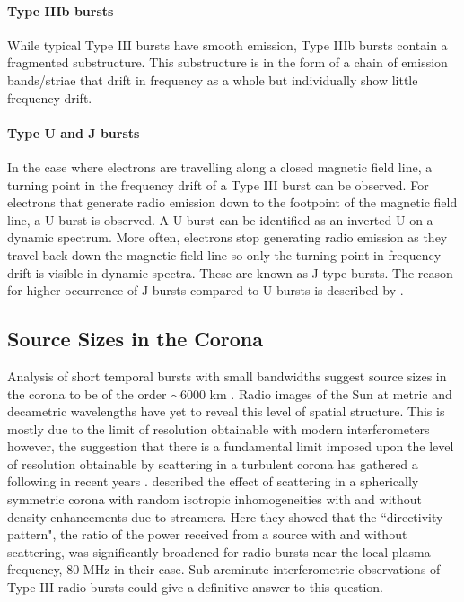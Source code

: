 \paragraph{Type IIIb bursts}
While typical Type III bursts have smooth emission, Type IIIb bursts contain a fragmented substructure. This substructure is in the form of a chain of emission bands/striae that drift in frequency as a whole but individually show little frequency drift.

\paragraph{Type U and J bursts}
In the case where electrons are travelling along a closed magnetic field line, a turning point in the frequency drift of a Type III burst can be observed. For electrons that generate radio emission down to the footpoint of the magnetic field line, a U burst is observed. A U burst can be identified as an inverted U on a dynamic spectrum. More often, electrons stop generating radio emission as they travel back down the magnetic field line so only the turning point in frequency drift is visible in dynamic spectra. These are known as J type bursts. The reason for higher occurrence of J bursts compared to U bursts is described by \cite{Reid2017}.




\subsection{Source Sizes in the Corona}
Analysis of short temporal bursts with small bandwidths suggest source sizes in the corona to be of the order $\sim 6000$ km \citep{McConnell1980}. Radio images of the Sun at metric and decametric wavelengths have yet to reveal this level of spatial structure. This is mostly due to the limit of resolution obtainable with modern interferometers however, the suggestion that there is a fundamental limit imposed upon the level of resolution obtainable by scattering in a turbulent corona \citep{Bastian1994} has gathered a following in recent years \citep{Kontar2017}. \cite{Riddle1974} described the effect of scattering in a spherically symmetric corona with random isotropic inhomogeneities with and without density enhancements due to streamers. Here they showed that the ``directivity pattern", the ratio of the power received from a source with and without scattering, was significantly broadened for radio bursts near the local plasma frequency, 80 MHz in their case.
Sub-arcminute interferometric observations of Type III radio bursts could give a definitive answer to this question.

